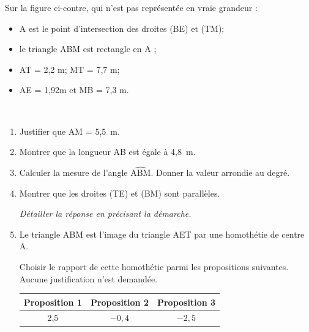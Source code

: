 \begin{minipage}{0.45\linewidth}
	Sur la figure ci-contre, qui n'est pas représentée en vraie grandeur :
	\begin{itemize}
		\item A est le point d'intersection des droites (BE) et (TM);
		\item le triangle ABM est rectangle en A ;
		\item AT = 2,2 m; MT = 7,7 m;
		\item AE = 1,92m et MB = 7,3 m.
	\end{itemize}
\end{minipage}\hfill~
\medskip

\begin{enumerate}
	\item Justifier que AM = 5,5~m.

	\item Montrer que la longueur AB est égale à 4,8~m.

	\item Calculer la mesure de l'angle $\widehat{\text{ABM}}$. Donner la valeur arrondie au degré.

	\item Montrer que les droites (TE) et (BM) sont parallèles.

	\textit{Détailler la réponse en précisant la démarche.}

	\item Le triangle ABM est l'image du triangle AET par une homothétie de centre A.

	Choisir le rapport de cette homothétie parmi les propositions suivantes. Aucune justification n'est demandée.

	\begin{center}
		\begin{tabular}{|c|c|c|}
			\hline
			\textbf{Proposition 1} & \textbf{Proposition 2} & \textbf{Proposition 3} \\
			\hline
			2,5 & $-0,4$ & $-2,5$ \\
			\hline
		\end{tabular}
	\end{center}
\end{enumerate}

